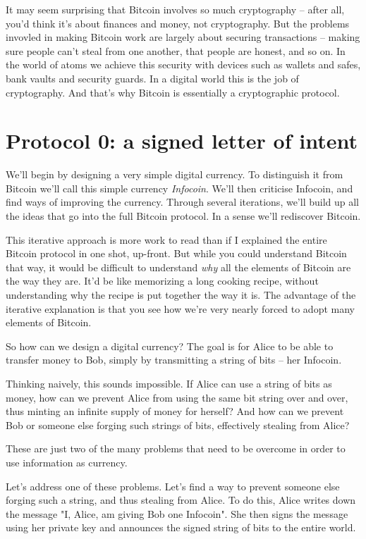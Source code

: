 \documentclass[12pt]{book}
\newcounter{problem}[chapter]
\begin{document}
%
%
It may seem surprising that Bitcoin involves so much cryptography --
after all, you'd think it's about finances and money, not
cryptography.  But the problems invovled in making Bitcoin work are
largely about securing transactions -- making sure people can't steal
from one another, that people are honest, and so on.  In the world of
atoms we achieve this security with devices such as wallets and safes,
bank vaults and security guards.  In a digital world this is the job
of cryptography.  And that's why Bitcoin is essentially a
cryptographic protocol.

\section{Protocol 0: a signed letter of intent}

We'll begin by designing a very simple digital currency.  To
distinguish it from Bitcoin we'll call this simple currency
\emph{Infocoin}.  We'll then criticise Infocoin, and find ways of
improving the currency.  Through several iterations, we'll build up
all the ideas that go into the full Bitcoin protocol.  In a sense
we'll rediscover Bitcoin.

This iterative approach is more work to read than if I explained the
entire Bitcoin protocol in one shot, up-front.  But while you could
understand Bitcoin that way, it would be difficult to understand
\emph{why} all the elements of Bitcoin are the way they are.  It'd be
like memorizing a long cooking recipe, without understanding why the
recipe is put together the way it is.  The advantage of the iterative
explanation is that you see how we're very nearly forced to adopt many
elements of Bitcoin.

So how can we design a digital currency?  The goal is for Alice to be
able to transfer money to Bob, simply by transmitting a string of bits
-- her Infocoin.

Thinking naively, this sounds impossible.  If Alice can use a string
of bits as money, how can we prevent Alice from using the same bit
string over and over, thus minting an infinite supply of money for
herself?  And how can we prevent Bob or someone else forging such
strings of bits, effectively stealing from Alice?

These are just two of the many problems that need to be overcome in
order to use information as currency.

Let's address one of these problems.  Let's find a way to prevent
someone else forging such a string, and thus stealing from Alice.  To
do this, Alice writes down the message "I, Alice, am giving Bob one
Infocoin".  She then signs the message using her private key and
announces the signed string of bits to the entire world.
\end{document}
